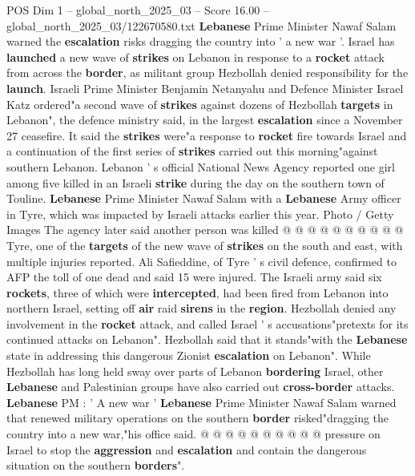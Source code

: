 \begin{textsample}{POS Dim 1 – global\_north\_2025\_03 – Score 16.00 – global\_north\_2025\_03/122670580.txt}  \label{ex:f1_pos_426}
\textbf{Lebanese} Prime Minister Nawaf Salam warned the \textbf{escalation} risks dragging the country into ' a new war '.
Israel has \textbf{launched} a new wave of \textbf{strikes} on Lebanon in response to a \textbf{rocket} attack from across the \textbf{border}, as militant group Hezbollah denied responsibility for the \textbf{launch}.
Israeli Prime Minister Benjamin Netanyahu and Defence Minister Israel Katz ordered"a second wave of \textbf{strikes} against dozens of Hezbollah \textbf{targets} in Lebanon", the defence ministry said, in the largest \textbf{escalation} since a November 27 ceasefire.
It said the \textbf{strikes} were"a response to \textbf{rocket} fire towards Israel and a continuation of the first series of \textbf{strikes} carried out this morning"against southern Lebanon.
Lebanon ' s official National News Agency reported one girl among five killed in an Israeli \textbf{strike} during the day on the southern town of Touline. \textbf{Lebanese} Prime Minister Nawaf Salam with a \textbf{Lebanese} Army officer in Tyre, which was impacted by Israeli attacks earlier this year.
Photo / Getty Images The agency later said another person was killed @ @ @ @ @ @ @ @ @ @ Tyre, one of the \textbf{targets} of the new wave of \textbf{strikes} on the south and east, with multiple injuries reported.
Ali Safieddine, of Tyre ' s civil defence, confirmed to AFP the toll of one dead and said 15 were injured.
The Israeli army said six \textbf{rockets}, three of which were \textbf{intercepted}, had been fired from Lebanon into northern Israel, setting off \textbf{air} raid \textbf{sirens} in the \textbf{region}.
Hezbollah denied any involvement in the \textbf{rocket} attack, and called Israel ' s accusations"pretexts for its continued attacks on Lebanon".
Hezbollah said that it stands"with the \textbf{Lebanese} state in addressing this dangerous Zionist \textbf{escalation} on Lebanon".
While Hezbollah has long held sway over parts of Lebanon \textbf{bordering} Israel, other \textbf{Lebanese} and Palestinian groups have also carried out \textbf{cross-border} attacks. \textbf{Lebanese} PM : ' A new war ' \textbf{Lebanese} Prime Minister Nawaf Salam warned that renewed military operations on the southern \textbf{border} risked"dragging the country into a new war,"his office said. @ @ @ @ @ @ @ @ @ @ pressure on Israel to stop the \textbf{aggression} and \textbf{escalation} and contain the dangerous situation on the southern \textbf{borders}".

\end{textsample}
